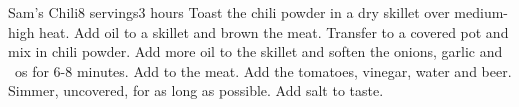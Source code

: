 \begin{recipe}{Sam's Chili}{8 servings}{3 hours}
Toast the chili powder in a dry skillet over medium-high heat.
Add oil to a skillet and brown the meat.  Transfer to a covered pot and mix in chili powder.
Add more oil to the skillet and soften the onions, garlic and ~os for 6-8 minutes.  Add to the meat.
Add the tomatoes, vinegar, water and beer.  Simmer, uncovered, for as long as possible.  Add salt to taste.
\end{recipe}
